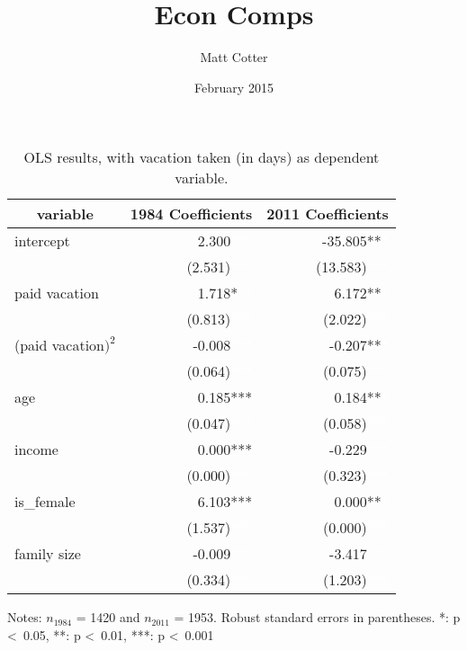 \documentclass{article}
\title{Econ Comps}
\author{Matt Cotter}
\date{February 2015}
\begin{document}
    \begin{center}
    \setlength{\extrarowheight}{3pt}
    \begin{table}[h]
    \centering
    \begin{tabular}{l|r|r}
    \multicolumn{1}{c|}{variable} &             1984 Coefficients &              2011 Coefficients \\ \hline \hline
    intercept                     &   2.300\textcolor{white}{***} &  -35.805**\textcolor{white}{*} \\
                                  & (2.531)\textcolor{white}{***} & (13.583)\textcolor{white}{***} \\ \hline
    paid vacation                 &   1.718*\textcolor{white}{**} &    6.172**\textcolor{white}{*} \\
                                  & (0.813)\textcolor{white}{***} &  (2.022)\textcolor{white}{***} \\ \hline
    (paid vacation$)^2$           &  -0.008\textcolor{white}{***} &   -0.207**\textcolor{white}{*} \\
                                  & (0.064)\textcolor{white}{***} &  (0.075)\textcolor{white}{***} \\ \hline
    age                           &   0.185***\textcolor{white}{} &    0.184**\textcolor{white}{*} \\
                                  & (0.047)\textcolor{white}{***} &  (0.058)\textcolor{white}{***} \\ \hline
    income                        &   0.000***\textcolor{white}{} &   -0.229\textcolor{white}{***} \\
                                  & (0.000)\textcolor{white}{***} &  (0.323)\textcolor{white}{***} \\ \hline
    is\_female                    &   6.103***\textcolor{white}{} &    0.000**\textcolor{white}{*} \\
                                  & (1.537)\textcolor{white}{***} &  (0.000)\textcolor{white}{***} \\ \hline
    family size                   &  -0.009\textcolor{white}{***} &   -3.417\textcolor{white}{***} \\
                                  & (0.334)\textcolor{white}{***} &  (1.203)\textcolor{white}{***}
    \end{tabular}
    \caption{OLS results, with vacation taken (in days) as dependent variable.}
    \label{my-label}
      Notes: $n_{1984}$ = 1420 and $n_{2011}$ = 1953.
      Robust standard errors in parentheses.
      *: p \textless\ 0.05, **: p \textless\ 0.01, ***: p \textless\ 0.001
    \end{table}
    \end{center}
\end{document}
